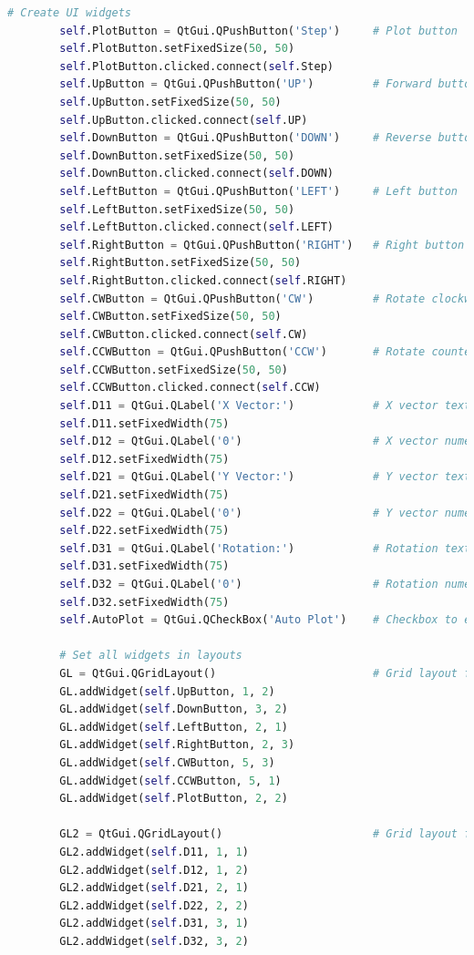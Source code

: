 \begin{lstlisting}[language = python]
        # Create UI widgets
        self.PlotButton = QtGui.QPushButton('Step')     # Plot button
        self.PlotButton.setFixedSize(50, 50)
        self.PlotButton.clicked.connect(self.Step)
        self.UpButton = QtGui.QPushButton('UP')         # Forward button
        self.UpButton.setFixedSize(50, 50)
        self.UpButton.clicked.connect(self.UP)
        self.DownButton = QtGui.QPushButton('DOWN')     # Reverse button
        self.DownButton.setFixedSize(50, 50)
        self.DownButton.clicked.connect(self.DOWN)
        self.LeftButton = QtGui.QPushButton('LEFT')     # Left button
        self.LeftButton.setFixedSize(50, 50)
        self.LeftButton.clicked.connect(self.LEFT)
        self.RightButton = QtGui.QPushButton('RIGHT')   # Right button
        self.RightButton.setFixedSize(50, 50)
        self.RightButton.clicked.connect(self.RIGHT)
        self.CWButton = QtGui.QPushButton('CW')         # Rotate clockwise button
        self.CWButton.setFixedSize(50, 50)
        self.CWButton.clicked.connect(self.CW)
        self.CCWButton = QtGui.QPushButton('CCW')       # Rotate counterclockwise button
        self.CCWButton.setFixedSize(50, 50)
        self.CCWButton.clicked.connect(self.CCW)
        self.D11 = QtGui.QLabel('X Vector:')            # X vector text label
        self.D11.setFixedWidth(75)
        self.D12 = QtGui.QLabel('0')                    # X vector numerical label
        self.D12.setFixedWidth(75)
        self.D21 = QtGui.QLabel('Y Vector:')            # Y vector text label
        self.D21.setFixedWidth(75)
        self.D22 = QtGui.QLabel('0')                    # Y vector numerical label
        self.D22.setFixedWidth(75)
        self.D31 = QtGui.QLabel('Rotation:')            # Rotation text label
        self.D31.setFixedWidth(75)
        self.D32 = QtGui.QLabel('0')                    # Rotation numerical label
        self.D32.setFixedWidth(75)
        self.AutoPlot = QtGui.QCheckBox('Auto Plot')    # Checkbox to enable plotting on press of a a directional button

        # Set all widgets in layouts
        GL = QtGui.QGridLayout()                        # Grid layout for buttons
        GL.addWidget(self.UpButton, 1, 2)
        GL.addWidget(self.DownButton, 3, 2)
        GL.addWidget(self.LeftButton, 2, 1)
        GL.addWidget(self.RightButton, 2, 3)
        GL.addWidget(self.CWButton, 5, 3)
        GL.addWidget(self.CCWButton, 5, 1)
        GL.addWidget(self.PlotButton, 2, 2)

        GL2 = QtGui.QGridLayout()                       # Grid layout for labels
        GL2.addWidget(self.D11, 1, 1)
        GL2.addWidget(self.D12, 1, 2)
        GL2.addWidget(self.D21, 2, 1)
        GL2.addWidget(self.D22, 2, 2)
        GL2.addWidget(self.D31, 3, 1)
        GL2.addWidget(self.D32, 3, 2)


\end{lstlisting}

